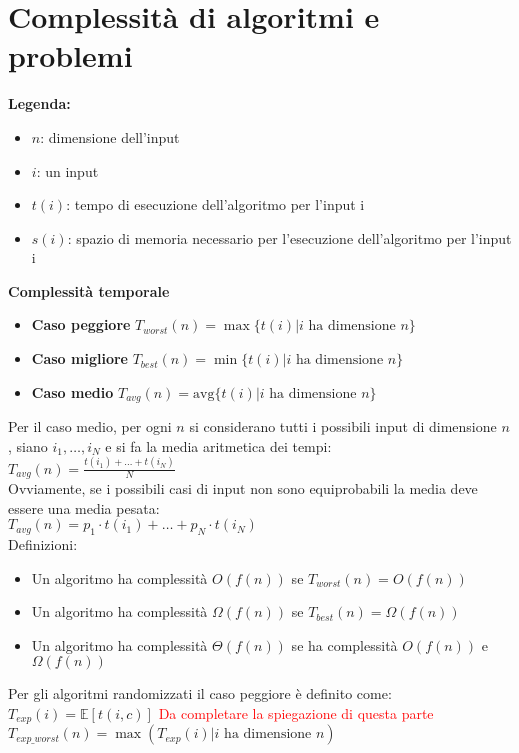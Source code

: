 \documentclass[12pt, a4paper]{report}
\begin{document}
\section{Complessità di algoritmi e problemi}
\textbf{Legenda:}
\begin{itemize}
    \item $n$: dimensione dell'input
    \item $i$: un input
    \item $t(i)$: tempo di esecuzione dell'algoritmo per l'input i
    \item $s(i)$: spazio di memoria necessario per l'esecuzione dell'algoritmo per l'input i
\end{itemize}
\textbf{Complessità temporale}
\begin{itemize}
    \item \textbf{Caso peggiore} $T_{worst}(n)=\max\{t(i)|i \text{ ha dimensione } n\}$
    \item \textbf{Caso migliore} $T_{best}(n)=\min\{t(i)|i \text{ ha dimensione } n\}$
    \item \textbf{Caso medio} $T_{avg}(n)=\text{avg}\{t(i)|i \text{ ha dimensione } n\}$
\end{itemize}
Per il caso medio, per ogni $n$ si considerano tutti i possibili input di dimensione $n$, siano $i_{1},\ldots,i_{N}$ e si fa la media aritmetica dei tempi:\\
$T_{avg}(n)=\frac{t(i_{1})+\ldots+t(i_{N})}{N}$\\
Ovviamente, se i possibili casi di input non sono equiprobabili la media deve essere una media pesata:\\
$T_{avg}(n)=p_{1}\cdot t(i_{1})+\ldots+p_{N}\cdot t(i_{N})$\\
Definizioni:
\begin{itemize}
    \item Un algoritmo ha complessità $O(f(n))$ se $T_{worst}(n)=O(f(n))$
    \item Un algoritmo ha complessità $\Omega(f(n))$ se $T_{best}(n)=\Omega(f(n))$
    \item Un algoritmo ha complessità $\Theta(f(n))$ se ha complessità $O(f(n))$ e $\Omega(f(n))$
\end{itemize}
Per gli algoritmi randomizzati il caso peggiore è definito come:\\
$T_{exp}(i)=\mathbb{E}[t(i,c)]$ \textcolor{red}{Da completare la spiegazione di questa parte} \\
$T_{exp\_worst}(n)=\max(T_{exp}(i)|i \text{ ha dimensione } n)$\\
\end{document}
